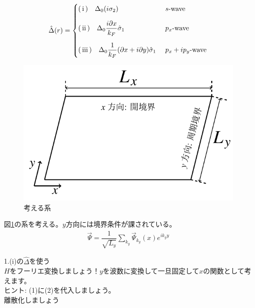\documentclass{jarticle}
\begin{document}
\begin{align}
\hat{\Delta}(r)=
\begin{cases}
$\rm(\hspace{.18em}i\hspace{.18em})\quad$\Delta_0(i\sigma_2)
& \mbox{$s$-wave}
\vspace*{1em}\\
$\rm(\hspace{.18em}ii\hspace{.18em})$\quad\Delta_0\dfrac{i\partial x}{k_F}\hat\sigma_1
& \mbox{$p_x$-wave}
\vspace*{1em}\\
$\rm(\hspace{.18em}iii\hspace{.18em})$\quad\Delta_0\dfrac{1}{k_F}(\partial x+i\partial y)\hat\sigma_1\
& \mbox{$p_x+ip_y$-wave}
\end{cases}
\label{delta}
\end{align}
\begin{figure}[H]
	\centering
	\includegraphics[scale=1]{./figure_fix.pdf}
	\caption{考える系}
	\label{system}
\end{figure}
図\ref{system}の系を考える。$y$方向には境界条件が課されている。
\begin{align}
\vec{\Psi}=\dfrac{1}{\sqrt{L_y}}\displaystyle\sum_{k_y}\vec{\Psi}_{k_y}(x)e^{ik_yy}
\end{align}
\begin{enumerate}
1.(i)の$\hat{\Delta}$を使う\\		                                               	%
\ding{"AB} $H$をフーリエ変換しましょう！$y$を波数に変換して一旦固定して$x$の関数として考えます。
\\ ヒント: (1)に(2)を代入しましょう。\\
離散化しましょう\\
\end{enumerate}
\end{document}
